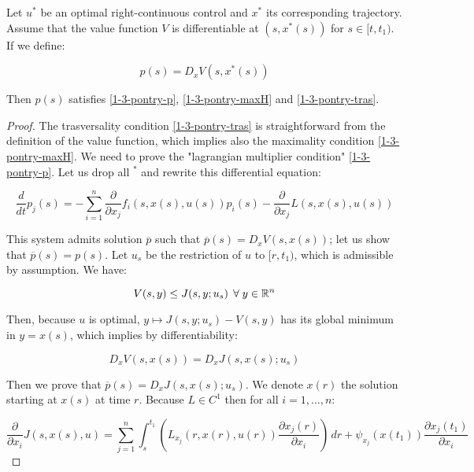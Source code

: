 \begin{theorem}\label{1-3-pontrydyn}
    Let $u^{\ast}$ be an optimal right-continuous control and $x^{\ast}$ its corresponding trajectory. 
    Assume that the value function $V$ is differentiable at $(s,x^{\ast}(s))$ for $s\in[t,t_1)$. If we define:

    \begin{equation}\label{1-3-pontrydyn-defP}
        p(s) = D_x V(s,x^{\ast}(s)) 
    \end{equation}

    Then $p(s)$ satisfies \ref{1-3-pontry-p}, \ref{1-3-pontry-maxH} and \ref{1-3-pontry-tras}.

    \begin{proof}
        The trasversality condition \ref{1-3-pontry-tras} is straightforward from the definition of the  
        value function, which implies also the maximality condition \ref{1-3-pontry-maxH}. 
        We need to prove the "lagrangian multiplier condition" \ref{1-3-pontry-p}. 
        Let us drop all $^{\ast}$ and rewrite this differential equation:

        \begin{equation}\label{1-3-pontrydyn-rewritecond}
            \frac{d}{dt} p_j(s) = - \sum_{i=1}^n \frac{\partial}{\partial x_j}f_i(s,x(s),u(s))p_i(s) - \frac{\partial}{\partial x_j}L(s,x(s),u(s))
        \end{equation}

        This system admits solution $\overline{p}$ such that $\overline{p}(s)=D_xV(s,x(s))$; let us show that $\overline{p}(s)=p(s)$. Let $u_s$ be 
        the restriction of $u$ to $[r,t_1)$, which is admissible by assumption. We have:

        \[V(s,y) \leq J(s,y;u_s) \,\forall y\in\R^n\]

        Then, because $u$ is optimal, $y\mapsto J(s,y;u_s) - V(s,y)$ has its global minimum in $y=x(s)$, which implies by differentiability:

        \begin{equation}\label{1-3-pontrydyn-derconV}
            D_x V(s,x(s)) = D_x J(s,x(s);u_s)
        \end{equation}

        Then we prove that $\overline{p}(s) = D_x J(s,x(s);u_s)$. We denote $x(r)$ the solution starting at $x(s)$ at time $r$. Because $L\in C^1$ then for all $i=1,\dots,n$:

        \begin{equation}
            \frac{\partial}{\partial x_i}J(s,x(s),u) = \sum_{j=1}^n \int_s^{t_1} \left(L_{x_j}(r,x(r),u(r))\frac{\partial x_j(r)}{\partial x_i}\right) \,dr + \psi_{x_j}(x(t_1))\frac{\partial x_j(t_1)}{\partial x_i}
        \end{equation} 


\end{proof}
\end{theorem}
